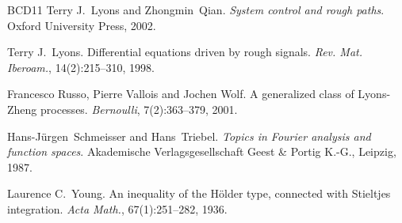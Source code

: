 \documentclass[a4paper,11pt]{article}
\newcommand{\tmtextit}[1]{{\itshape{#1}}}
\begin{document}
\begin{thebibliography}{BCD11}
  Terry J.~Lyons  and  Zhongmin~Qian.{\newblock}
  \tmtextit{System control and rough paths}.{\newblock} Oxford University
  Press, 2002.{\newblock}
  
  Terry J.~Lyons.{\newblock} Differential equations
  driven by rough signals.{\newblock} \tmtextit{Rev. Mat. Iberoam.},
  14(2):215--310, 1998.{\newblock}
  
  Francesco Russo, Pierre Vallois and Jochen Wolf.{\newblock} A generalized class of Lyons-Zheng processes.{\newblock} \tmtextit{Bernoulli},
  7(2):363--379, 2001.{\newblock}  
  
  Hans-J{\"u}rgen~Schmeisser  and  Hans~Triebel.{\newblock}
  \tmtextit{Topics in Fourier analysis and function spaces}.{\newblock} Akademische
  Verlagsgesellschaft Geest \& Portig K.-G., Leipzig, 1987.{\newblock}
  
  Laurence C.~Young.{\newblock} An inequality of the
  H{\"o}lder type, connected with Stieltjes integration.{\newblock}
  \tmtextit{Acta Math.}, 67(1):251--282, 1936.{\newblock}
\end{thebibliography}
\end{document}
